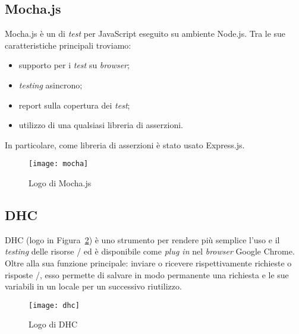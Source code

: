 \subsection{Mocha.js} \label{mocha}
Mocha.js è un  di \textit{test} per JavaScript eseguito su ambiente Node.js. Tra le sue caratteristiche principali troviamo:
\begin{itemize}
\item supporto per i \textit{test} su \textit{browser};
\item \textit{testing} asincrono;
\item report sulla copertura dei \textit{test};
\item utilizzo di una qualsiasi libreria di asserzioni.
\end{itemize}
In particolare, come libreria di asserzioni è stato usato Express.js.
\begin{figure}[h]
\begin{center}
    \texttt{[image: mocha]}
    \caption{Logo di Mocha.js}
    \label{fig:mocha}
\end{center}
\end{figure}

\subsection{DHC} \label{dhc}
DHC (logo in Figura~\ref{fig:dhc}) è uno strumento per rendere più semplice l'uso
e il \textit{testing} delle risorse / ed è disponibile come \textit{plug in} nel \textit{browser} Google Chrome. Oltre alla sua funzione principale: inviare o ricevere rispettivamente richieste o risposte /, esso permette di salvare in modo permanente una richiesta e le sue variabili in un  locale per un successivo riutilizzo.
\begin{figure}[hbpc]
\begin{center}
\texttt{[image: dhc]}
\caption[Logo di DHC]{Logo di DHC\protect\footnotemark}
\label{fig:dhc}
\end{center}
\end{figure}

